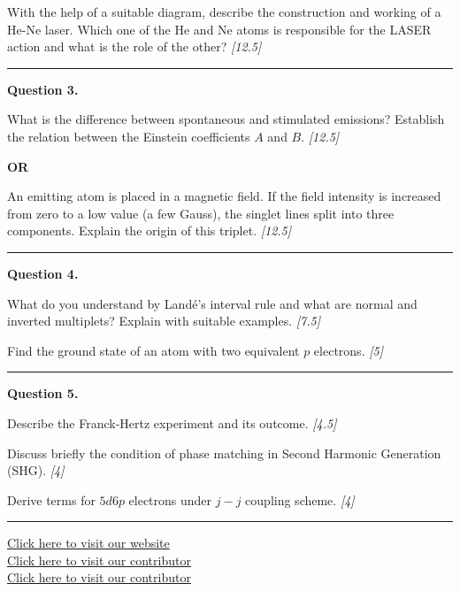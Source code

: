 \documentclass[11pt,a4paper]{article}
\newcommand{\pts}[1]{\hfill   \textit{[#1]}}
\begin{document}
\begin{parts}
  \item With the help of a suitable diagram, describe the construction and working of a He-Ne laser. Which one of the He and Ne atoms is responsible for the LASER action and what is the role of the other? \pts{12.5}
\end{parts}

\medskip\rule{\linewidth}{0.2pt}




\noindent   \textbf{Question 3.}

\begin{parts}
  \item What is the difference between spontaneous and stimulated emissions? Establish the relation between the Einstein coefficients $A$ and $B$. \pts{12.5}
\end{parts}
\hfill   \textbf{OR}

\begin{parts}
  \item An emitting atom is placed in a magnetic field. If the field intensity is increased from zero to a low value (a few Gauss), the singlet lines split into three components. Explain the origin of this triplet. \pts{12.5}
\end{parts}

\medskip\rule{\linewidth}{0.2pt}




\noindent   \textbf{Question 4.}

\begin{parts}
  \item What do you understand by Land\'{e}’s interval rule and what are normal and inverted multiplets? Explain with suitable examples. \pts{7.5}
  \item Find the ground state of an atom with two equivalent $p$ electrons. \pts{5}
\end{parts}

\medskip\rule{\linewidth}{0.2pt}




\noindent   \textbf{Question 5.}

\begin{parts}
  \item Describe the Franck-Hertz experiment and its outcome. \pts{4.5}
  \item Discuss briefly the condition of phase matching in Second Harmonic Generation (SHG). \pts{4}
  \item Derive terms for $5d6p$ electrons under $j-j$ coupling scheme. \pts{4}
\end{parts}

\vfill
\rule{\linewidth}{0.4pt}

\begin{center}\small
  \href{https://bhu-exam.vercel.app/}{Click here to visit our website}\\[4pt]
  \href{https://me-aryan.vercel.app/}{Click here to visit our contributor}\\[4pt]
  \href{https://quashan-me.vercel.app/}{Click here to visit our contributor}
\end{center}
\end{document}
